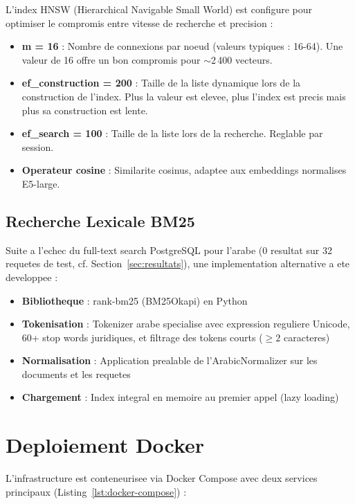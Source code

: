L'index HNSW (Hierarchical Navigable Small World) est configure pour optimiser le compromis entre vitesse de recherche et precision :

\begin{itemize}
    \item \textbf{m = 16} : Nombre de connexions par noeud (valeurs typiques : 16-64). Une valeur de 16 offre un bon compromis pour $\sim$2\,400 vecteurs.
    \item \textbf{ef\_construction = 200} : Taille de la liste dynamique lors de la construction de l'index. Plus la valeur est elevee, plus l'index est precis mais plus sa construction est lente.
    \item \textbf{ef\_search = 100} : Taille de la liste lors de la recherche. Reglable par session.
    \item \textbf{Operateur cosine} : Similarite cosinus, adaptee aux embeddings normalises E5-large.
\end{itemize}

\subsection{Recherche Lexicale BM25}

Suite a l'echec du full-text search PostgreSQL pour l'arabe (0 resultat sur 32 requetes de test, cf. Section~\ref{sec:resultats}), une implementation alternative a ete developpee :

\begin{itemize}
    \item \textbf{Bibliotheque} : rank-bm25 (BM25Okapi) en Python
    \item \textbf{Tokenisation} : Tokenizer arabe specialise avec expression reguliere Unicode, 60+ stop words juridiques, et filtrage des tokens courts ($\ge 2$ caracteres)
    \item \textbf{Normalisation} : Application prealable de l'ArabicNormalizer sur les documents et les requetes
    \item \textbf{Chargement} : Index integral en memoire au premier appel (lazy loading)
\end{itemize}

\section{Deploiement Docker}

L'infrastructure est conteneurisee via Docker Compose avec deux services principaux (Listing~\ref{lst:docker-compose}) :

